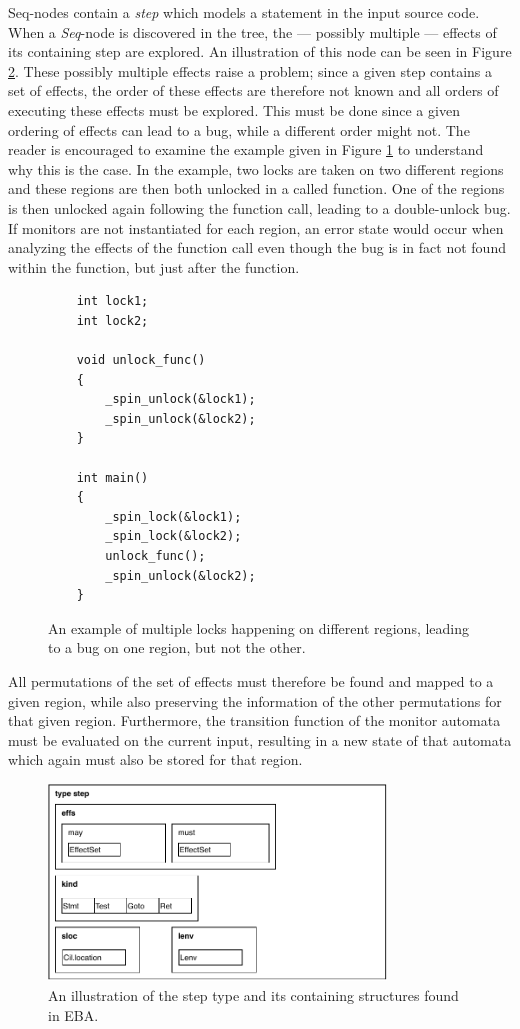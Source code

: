 \noindent Seq-nodes contain a \textit{step} which models a statement in the input source code. When a \textit{Seq}-node is discovered in the tree, the --- possibly multiple --- effects of its containing step are explored. An illustration of this node can be seen in Figure \ref{cfg-step}. These possibly multiple effects raise a problem; since a given step contains a set of effects, the order of these effects are therefore not known and all orders of executing these effects must be explored. This must be done since a given ordering of effects can lead to a bug, while a different order might not. The reader is encouraged to examine the example given in Figure \ref{multiple-region-example} to understand why this is the case. In the example, two locks are taken on two different regions and these regions are then both unlocked in a called function. One of the regions is then unlocked again following the function call, leading to a double-unlock bug. If monitors are not instantiated for each region, an error state would occur when analyzing the effects of the function call even though the bug is in fact not found within the function, but just after the function. 

\begin{figure}[H]
    \centering
    \begin{verbatim}
    int lock1;
    int lock2;

    void unlock_func()
    {
        _spin_unlock(&lock1);
        _spin_unlock(&lock2);
    }

    int main()
    {
        _spin_lock(&lock1);
        _spin_lock(&lock2);
        unlock_func();
        _spin_unlock(&lock2);
    }
    \end{verbatim}
    \caption{An example of multiple locks happening on different regions, leading to a bug on one region, but not the other.}
    \label{multiple-region-example}
\end{figure}

All permutations of the set of effects must therefore be found and mapped to a given region, while also preserving the information of the other permutations for that given region. Furthermore, the transition function of the monitor automata must be evaluated on the current input, resulting in a new state of that automata which again must also be stored for that region.

\begin{figure}[H]
    \centering
    \includegraphics[width=0.8\textwidth]{implementation/figures/step}
    \caption{An illustration of the step type and its containing structures found in EBA.}
    \label{cfg-step}
\end{figure}

